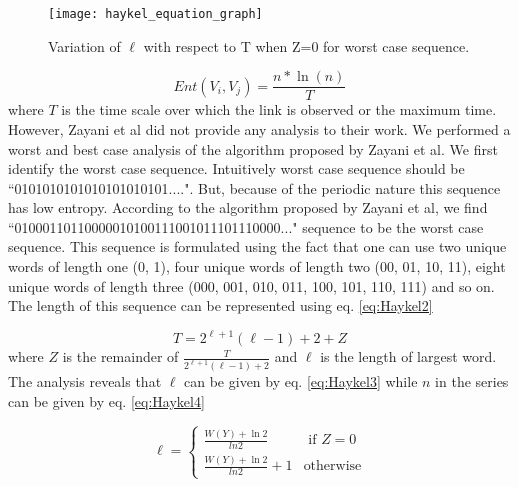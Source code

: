 \documentclass[preprint, twocolumn,5p]{elsarticle}
\begin{document}
        \begin{figure}
            \centering
            \texttt{[image: haykel\_equation\_graph]}
            \caption{Variation of $\ell$ with respect to T when Z=0 for worst case sequence.}
            \label{fig:haykelequationgraph}
        \end{figure}

        \begin {equation}\label{eq:Haykel}
        Ent(V_{i},V_{j})=\frac{n*\ln(n)}{T}
        \end{equation}
        where $T$ is the time scale over which the link is observed or the maximum time. However, Zayani et al did not provide any analysis to their work. We performed a worst and best case analysis of the algorithm proposed by Zayani et al. We first identify the worst case sequence. Intuitively worst case sequence should be ``0101010101010101010101....". But, because of the periodic nature this sequence has low entropy. According to the algorithm proposed by Zayani et al, we find ``01000110110000010100111001011101110000..." sequence to be the worst case sequence. This sequence is formulated using the fact that one can use two unique words of length one (0, 1), four unique words of length two (00, 01, 10, 11), eight unique words of length three (000, 001, 010, 011, 100, 101, 110, 111) and so on. The length of this sequence can be represented using eq. \ref{eq:Haykel2}

        \begin {equation}\label{eq:Haykel2}
        T=2^{\ell+1}(\ell-1)+2+Z
        \end{equation}
        where $Z$ is the remainder of $\frac{T}{2^{\ell+1}(\ell-1)+2}$ and $\ell$ is the length of largest word. The analysis reveals that $\ell$ can be given by eq. \ref{eq:Haykel3} while $n$ in the series can be given by eq. \ref{eq:Haykel4}

        \begin {equation}\label{eq:Haykel3}
        \ell=\begin{cases}
         \frac{W(Y)+\ln2}{ln2}& \text{ if } Z=0\\
         \frac{W(Y)+\ln2}{ln2}+1& \text{otherwise}
        \end{cases}
        \end{equation}
\end{document}
